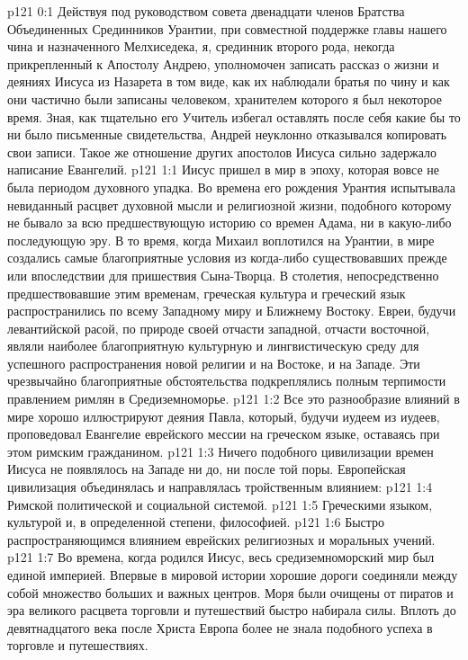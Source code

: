 \author{Комиссия срединников}
\vs p121 0:1 Действуя под руководством совета двенадцати членов Братства Объединенных Срединников Урантии, при совместной поддержке главы нашего чина и назначенного Мелхиседека, я, срединник второго рода, некогда прикрепленный к Апостолу Андрею, уполномочен записать рассказ о жизни и деяниях Иисуса из Назарета в том виде, как их наблюдали братья по чину и как они частично были записаны человеком, хранителем которого я был некоторое время. Зная, как тщательно его Учитель избегал оставлять после себя какие бы то ни было письменные свидетельства, Андрей неуклонно отказывался копировать свои записи. Такое же отношение других апостолов Иисуса сильно задержало написание Евангелий.
\vs p121 1:1 Иисус пришел в мир в эпоху, которая вовсе не была периодом духовного упадка. Во времена его рождения Урантия испытывала невиданный расцвет духовной мысли и религиозной жизни, подобного которому не бывало за всю предшествующую историю со времен Адама, ни в какую\hyp{}либо последующую эру. В то время, когда Михаил воплотился на Урантии, в мире создались самые благоприятные условия из когда\hyp{}либо существовавших прежде или впоследствии для пришествия Сына\hyp{}Творца. В столетия, непосредственно предшествовавшие этим временам, греческая культура и греческий язык распространились по всему Западному миру и Ближнему Востоку. Евреи, будучи левантийской расой, по природе своей отчасти западной, отчасти восточной, являли наиболее благоприятную культурную и лингвистическую среду для успешного распространения новой религии и на Востоке, и на Западе. Эти чрезвычайно благоприятные обстоятельства подкреплялись полным терпимости правлением римлян в Средиземноморье.
\vs p121 1:2 Все это разнообразие влияний в мире хорошо иллюстрируют деяния Павла, который, будучи иудеем из иудеев, проповедовал Евангелие еврейского мессии на греческом языке, оставаясь при этом римским гражданином.
\vs p121 1:3 Ничего подобного цивилизации времен Иисуса не появлялось на Западе ни до, ни после той поры. Европейская цивилизация объединялась и направлялась тройственным влиянием:
\vs p121 1:4 \bibnobreakspace Римской политической и социальной системой.
\vs p121 1:5 \bibnobreakspace Греческими языком, культурой и, в определенной степени, философией.
\vs p121 1:6 \bibnobreakspace Быстро распространяющимся влиянием еврейских религиозных и моральных учений.
\vs p121 1:7 \pc Во времена, когда родился Иисус, весь средиземноморский мир был единой империей. Впервые в мировой истории хорошие дороги соединяли между собой множество больших и важных центров. Моря были очищены от пиратов и эра великого расцвета торговли и путешествий быстро набирала силы. Вплоть до девятнадцатого века после Христа Европа более не знала подобного успеха в торговле и путешествиях.
